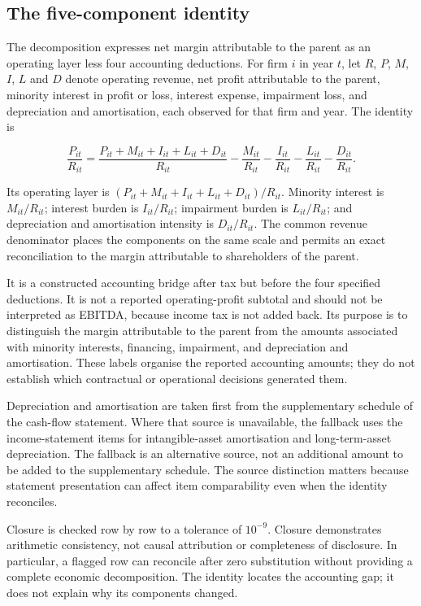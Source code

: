 \documentclass[review,3p,times]{elsarticle}
\begin{document}
\subsection{The five-component identity}

The decomposition expresses net margin attributable to the parent as an operating layer less four accounting deductions. For firm $i$ in year $t$, let $R$, $P$, $M$, $I$, $L$ and $D$ denote operating revenue, net profit attributable to the parent, minority interest in profit or loss, interest expense, impairment loss, and depreciation and amortisation, each observed for that firm and year. The identity is

\[
\frac{P_{it}}{R_{it}}
=
\frac{P_{it}+M_{it}+I_{it}+L_{it}+D_{it}}{R_{it}}
-
\frac{M_{it}}{R_{it}}
-
\frac{I_{it}}{R_{it}}
-
\frac{L_{it}}{R_{it}}
-
\frac{D_{it}}{R_{it}}.
\]

Its operating layer is $(P_{it}+M_{it}+I_{it}+L_{it}+D_{it})/R_{it}$. Minority interest is $M_{it}/R_{it}$; interest burden is $I_{it}/R_{it}$; impairment burden is $L_{it}/R_{it}$; and depreciation and amortisation intensity is $D_{it}/R_{it}$. The common revenue denominator places the components on the same scale and permits an exact reconciliation to the margin attributable to shareholders of the parent.

It is a constructed accounting bridge after tax but before the four specified deductions. It is not a reported operating-profit subtotal and should not be interpreted as EBITDA, because income tax is not added back. Its purpose is to distinguish the margin attributable to the parent from the amounts associated with minority interests, financing, impairment, and depreciation and amortisation. These labels organise the reported accounting amounts; they do not establish which contractual or operational decisions generated them.

Depreciation and amortisation are taken first from the supplementary schedule of the cash-flow statement. Where that source is unavailable, the fallback uses the income-statement items for intangible-asset amortisation and long-term-asset depreciation. The fallback is an alternative source, not an additional amount to be added to the supplementary schedule. The source distinction matters because statement presentation can affect item comparability even when the identity reconciles.

Closure is checked row by row to a tolerance of $10^{-9}$. Closure demonstrates arithmetic consistency, not causal attribution or completeness of disclosure. In particular, a flagged row can reconcile after zero substitution without providing a complete economic decomposition. The identity locates the accounting gap; it does not explain why its components changed.
\end{document}
